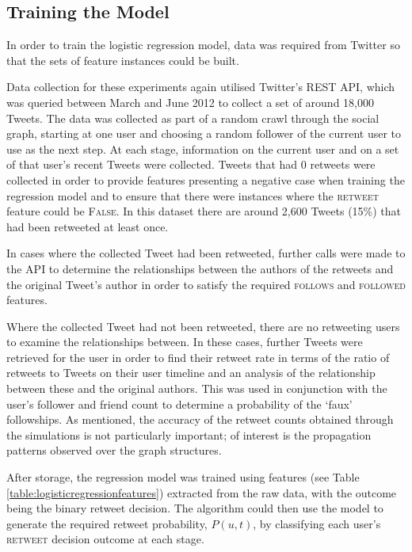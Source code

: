 \subsection{Training the Model}
In order to train the logistic regression model, data was required from Twitter so that the sets of feature instances could be built. 

Data collection for these experiments again utilised Twitter's REST API, which was queried between March and June 2012 to collect a set of around 18,000 Tweets. The data was collected as part of a random crawl through the social graph, starting at one user and choosing a random follower of the current user to use as the next step. At each stage, information on the current user and on a set of that user's recent Tweets were collected. Tweets that had 0 retweets were collected in order to provide features presenting a negative case when training the regression model and to ensure that there were instances where the \textsc{retweet} feature could be \textsc{False}. In this dataset there are around 2,600 Tweets (15\%) that had been retweeted at least once.

In cases where the collected Tweet had been retweeted, further calls were made to the API to determine the relationships between the authors of the retweets and the original Tweet's author in order to satisfy the required \textsc{follows} and \textsc{followed} features.

Where the collected Tweet had not been retweeted, there are no retweeting users to examine the relationships between. In these cases, further Tweets were retrieved for the user in order to find their retweet rate in terms of the ratio of retweets to Tweets on their user timeline and an analysis of the relationship between these and the original authors. This was used in conjunction with the user's follower and friend count to determine a probability of the `faux' followships. As mentioned, the accuracy of the retweet counts obtained through the simulations is not particularly important; of interest is the propagation patterns observed over the graph structures.

After storage, the regression model was trained using features (see Table \ref{table:logisticregressionfeatures}) extracted from the raw data, with the outcome being the binary retweet decision. The algorithm could then use the model to generate the required retweet probability, $P(u,t)$, by classifying each user's \textsc{retweet} decision outcome at each stage.



